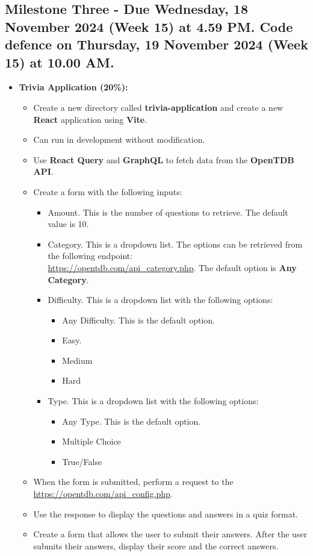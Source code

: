 \documentclass{article}
\begin{document}
	\subsection*{Milestone Three - Due Wednesday, 18 November 2024 (Week 15) at 4.59 PM. Code defence on Thursday, 19 November 2024 (Week 15) at 10.00 AM.}
	\begin{itemize}
	\item \textbf{Trivia Application (20\%):}
	\begin{itemize}
		\item Create a new directory called \textbf{trivia-application} and create a new \textbf{React} application using \textbf{Vite}.
		\item Can run in development without modification.
		\item Use \textbf{React Query} and \textbf{GraphQL} to fetch data from the \textbf{OpenTDB API}.
		\item Create a form with the following inputs:
		\begin{itemize}
			\item Amount. This is the number of questions to retrieve. The default value is 10.
			\item Category. This is a dropdown list. The options can be retrieved from the following endpoint:\\
			\href{https://opentdb.com/api\_category.php}{https://opentdb.com/api\_category.php}. The default option is \textbf{Any Category}.			
			\item Difficulty. This is a dropdown list with the following options:
			\begin{itemize}
				\item Any Difficulty. This is the default option.
				\item Easy. 
				\item Medium
				\item Hard
			\end{itemize}
			\item Type. This is a dropdown list with the following options:
			\begin{itemize}
				\item Any Type. This is the default option.
				\item Multiple Choice
				\item True/False
			\end{itemize}
		\end{itemize}
		\item When the form is submitted, perform a request to the \href{OpenTDB API}{https://opentdb.com/api\_config.php}. 
		\item Use the response to display the questions and answers in a quiz format. 
		\item Create a form that allows the user to submit their answers. After the user submits their answers, display their score and the correct answers.
	\end{itemize} 
\end{itemize}
\end{document}
